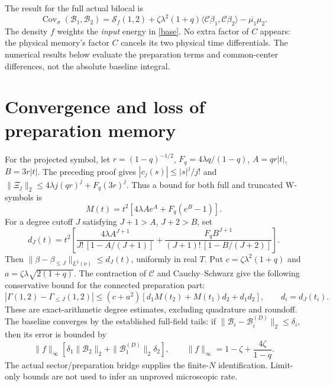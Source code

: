 \documentclass[11pt]{article}
\begin{document}
The result for the full actual bilocal is
\begin{equation}\label{full}
 \boxed{\operatorname{Cov}_{\sigma}(\mathcal B_1,\mathcal B_2)
 =\mathcal S_f(1,2)+\zeta\lambda^2(1+q)
 \langle\mathcal C\beta_1,\mathcal C\beta_2\rangle
                -\overline{\mu_1}\mu_2.}
\end{equation}
The density $f$ weights the \emph{input} energy in \eqref{base}.
No extra factor of $C$ appears: the physical memory's factor $C$
cancels its two physical time differentials.
The numerical results below evaluate the preparation terms and
common-center differences, not the absolute baseline integral.

\newpage
\section{Convergence and loss of preparation memory}
For the projected symbol, let $r=(1-q)^{-1/2}$,
$F_q=4\lambda q/(1-q)$, $A=qr|t|$, $B=3r|t|$. The preceding proof
gives $|c_j(s)|\le |s|^j/j!$ and
$\|\Xi_j\|_2\le4\lambda j(qr)^j+F_q(3r)^j$.
Thus a bound for both full and truncated W-symbols is
\begin{equation}
 M(t)=t^2[4\lambda A e^A+F_q(e^B-1)].
\end{equation}
For a degree cutoff $J$ satisfying $J+1>A$, $J+2>B$, set
\begin{equation}\label{tail}
 d_J(t)=t^2\left[
 \frac{4\lambda A^{J+1}}{J!\,[1-A/(J+1)]}
 +\frac{F_qB^{J+1}}{(J+1)!\,[1-B/(J+2)]}\right].
\end{equation}
Then $\|\beta-\beta_{\le J}\|_{L^2(\nu)}\le d_J(t)$,
uniformly in real $T$. Put
$c=\zeta\lambda^2(1+q)$ and
$a=\zeta\lambda\sqrt{2(1+q)}$.
The contraction of $\mathcal C$ and Cauchy--Schwarz give the
following conservative bound for the connected preparation part:
\begin{equation}\label{Gtail}
 |\Gamma(1,2)-\Gamma_{\le J}(1,2)|
 \le(c+a^2)[d_1M(t_2)+M(t_1)d_2+d_1d_2],
 \qquad d_i=d_J(t_i).
\end{equation}
These are exact-arithmetic degree estimates, excluding quadrature
and roundoff. The baseline converges by the established full-field
tails: if $\|\mathcal B_i-\mathcal B_i^{(D)}\|_2\le\delta_i$,
then its error is bounded by
\[
 \|f\|_\infty[\delta_1\|\mathcal B_2\|_2+
                         \|\mathcal B_1^{(D)}\|_2\delta_2],
 \qquad\|f\|_\infty=1-\zeta+\frac{4\zeta}{1-q}.
\]
The actual sector/preparation bridge \cite{sector} supplies the
finite-$N$ identification. Limit-only bounds are not used to
infer an unproved microscopic rate.
\end{document}

